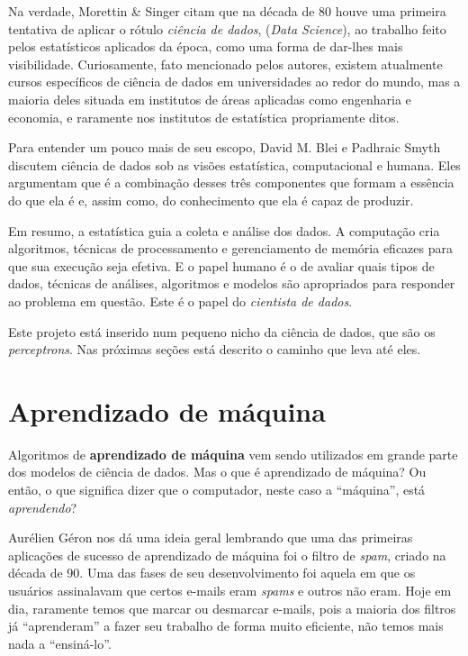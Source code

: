 \documentclass[12pt,brazil]{article}
\newcommand{\defi}[1]{\textbf{#1}}
\newcommand{\eng}[1]{\emph{#1}}
\begin{document}
Na verdade, Morettin \& Singer \citep{apostila} citam que na década de 80 houve uma primeira tentativa de aplicar o rótulo \emph{ciência de dados}, (\emph{Data Science}), ao trabalho feito pelos estatísticos aplicados da época, como uma forma de dar-lhes mais visibilidade. Curiosamente, fato mencionado pelos autores, existem atualmente cursos específicos de ciência de dados em universidades ao redor do mundo, mas a maioria deles situada em institutos de áreas aplicadas como engenharia e economia, e raramente nos institutos de estatística propriamente ditos.

Para entender um pouco mais de seu escopo, David M. Blei e Padhraic Smyth \citep{blei} discutem ciência de dados sob as visões estatística, computacional e humana. Eles argumentam que é a combinação desses três componentes que formam a essência do que ela é e, assim como, do conhecimento que ela é capaz de produzir.

Em resumo, a estatística guia a coleta e análise dos dados. A computação cria algoritmos, técnicas de processamento e gerenciamento de memória eficazes para que sua execução seja efetiva. E o papel humano é o de avaliar quais tipos de dados, técnicas de análises, algoritmos e modelos são apropriados para responder ao problema em questão. Este é o papel do \emph{cientista de dados}.

Este projeto está inserido num pequeno nicho da ciência de dados, que são os \eng{perceptrons}. Nas próximas seções está descrito o caminho que leva até eles.

\section{Aprendizado de máquina}

Algoritmos de \defi{aprendizado de máquina} vem sendo utilizados em grande parte dos modelos de ciência de dados. Mas o que é aprendizado de máquina? Ou então, o que significa dizer que o computador, neste caso a ``máquina'', está \emph{aprendendo}?

Aurélien Géron \citep{hands} nos dá uma ideia geral lembrando que uma das primeiras aplicações de sucesso de aprendizado de máquina foi o filtro de \eng{spam}, criado na década de 90. Uma das fases de seu desenvolvimento foi aquela em que os usuários assinalavam que certos e-mails eram \eng{spams} e outros não eram. Hoje em dia, raramente temos que marcar ou desmarcar e-mails, pois a maioria dos filtros já ``aprenderam'' a fazer seu trabalho de forma muito eficiente, não temos mais nada a ``ensiná-lo''.
\end{document}
